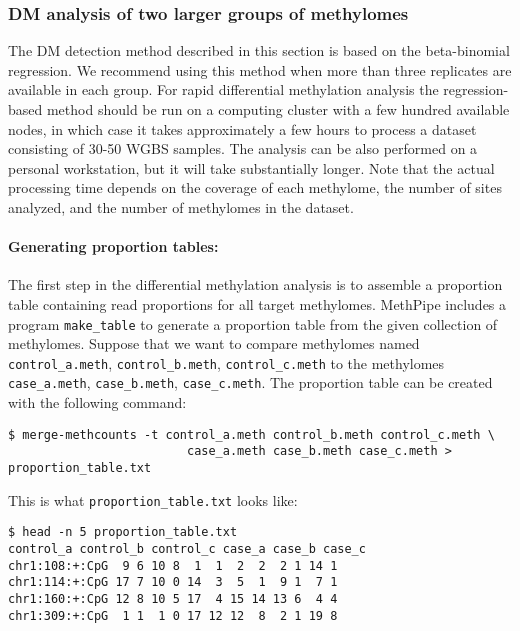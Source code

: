 \documentclass[10pt]{article}
\newcommand{\prog}[1]{\texttt{#1}}
\begin{document}
\subsubsection{DM analysis of two larger groups of methylomes}

The DM detection method described in this section is based on the beta-binomial
regression. We recommend using this method when more than three replicates 
are available in each group. For rapid differential methylation analysis the 
regression-based method should be run on a computing cluster with a few
hundred available nodes, in which case it takes approximately a few hours to
process a dataset consisting of 30-50 WGBS samples. The analysis can be also
performed on a personal workstation, but it will take substantially longer. Note
that the actual processing time depends on the coverage of each methylome, the
number of sites analyzed, and the number of methylomes in the dataset.

\paragraph{Generating proportion tables:} The first step in the differential 
methylation analysis is to assemble a proportion table containing read 
proportions for all target methylomes. MethPipe includes a program 
\prog{make\_table} to generate a proportion table from the given collection of 
methylomes. Suppose that we want to compare methylomes named 
{\tt control\_a.meth}, {\tt control\_b.meth}, {\tt control\_c.meth}
to the methylomes {\tt case\_a.meth}, {\tt case\_b.meth}, 
{\tt case\_c.meth}. The proportion table can be created with the following 
command:

{\small{%
\begin{verbatim}
$ merge-methcounts -t control_a.meth control_b.meth control_c.meth \
                         case_a.meth case_b.meth case_c.meth > proportion_table.txt
\end{verbatim}%
}}

This is what {\tt proportion\_table.txt} looks like:

{\small{%
\begin{verbatim}
$ head -n 5 proportion_table.txt
control_a control_b control_c case_a case_b case_c
chr1:108:+:CpG  9 6 10 8  1  1  2  2  2 1 14 1
chr1:114:+:CpG 17 7 10 0 14  3  5  1  9 1  7 1
chr1:160:+:CpG 12 8 10 5 17  4 15 14 13 6  4 4
chr1:309:+:CpG  1 1  1 0 17 12 12  8  2 1 19 8
\end{verbatim}%
}}
\end{document}
